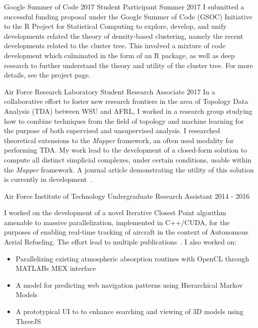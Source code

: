 \documentclass[11pt,a4paper,sans]{moderncv} %
\begin{document}

			 {Google Summer of Code 2017}
			 {Student Participant}
			 {Summer 2017}{}{\vspace{3pt} %
			 I submitted a successful funding proposal under the Google Summer of Code (GSOC) Initiative to the R Project for Statistical Computing to explore, develop, and unify developments related the theory of density-based clustering, namely the recent developments related to the cluster tree. This involved a mixture of code development which culminated in the form of an R package, as well as deep research to further understand the theory and utility of the cluster tree. For more details, see the project page\footnotemark. 
			 } 

			 {Air Force Research Laboratory}
			 {Student Research Associate}
			 {2017}{}{\vspace{3pt}
			 In a collaborative effort to foster new research frontiers in the area of Topology Data Analysis (TDA) between WSU and AFRL, I worked in a research group studying how to combine techniques from  the field of topology and machine learning for the purpose of both supervised and unsupervised analysis. I researched theoretical extensions to the \textit{Mapper} framework, an often used modality for performing TDA. My work lead to the development of a closed-form solution to compute all distinct simplicial complexes, under certain conditions, usable within the \textit{Mapper} framework. A journal article demonstrating the utility of this solution is currently in development~\cite{mapperext}. 
}

			 {Air Force Institute of Technology}
			 {Undergraduate Research Assistant}
			 {2014 - 2016}{}{\vspace{3pt}
I worked on the development of a novel Iterative Closest Point algorithm amenable to massive parallelization, implemented in C++/CUDA, for the purposes of enabling real-time tracking of aircraft in the context of Autonomous Aerial Refueling. The effort lead to multiple publications~\cite{piekenbrock2016automated, robinson2016parallelized}. I also worked on:
\begin{itemize}
	\item Parallelizing existing atmospheric absorption routines with OpenCL through MATLABs MEX interface
	\item A model for predicting web navigation patterns using Hierarchical Markov Models
	\item A prototypical UI to to enhance searching and viewing of 3D models using ThreeJS
\end{itemize}
}
\end{document}
